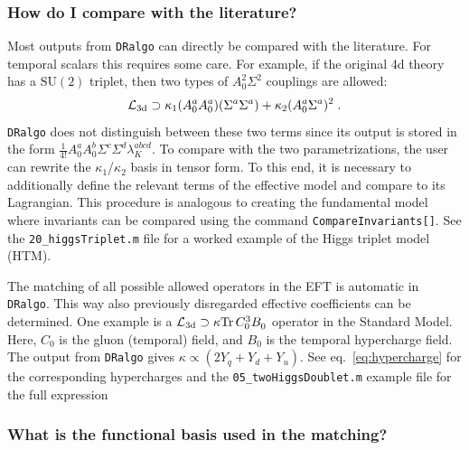 \documentclass[11pt]{article}
\def\dralgo{{\tt DRalgo}}
\renewcommand{\tr}{{\rm Tr\,}}
\newcommand{\Yq}{Y_{q}}
\newcommand{\Yu}{Y_{u}}
\newcommand{\Yd}{Y_{d}}
\renewcommand{\rmi}[1]{{\mbox{\scriptsize #1}}}
\begin{document}
%
\subsubsection{How do I compare with the literature?}
Most outputs from \dralgo{} can directly be compared with the literature.
For temporal scalars this requires some care. 
For example,
if the original 4d theory has a $\mathrm{SU}(2)$ triplet,
then two types of $A_0^2 \Sigma^2$ couplings are allowed:
\begin{align}
  \mathcal{L}_{\rmi{3d}} \supset
  \kappa_1 (A_0^a A_0^a)(\Sigma^a\Sigma^a) +
  \kappa_2 (A_0^a \Sigma^a)^2
  \;.
\end{align}
\dralgo{} does not distinguish between these two terms
since its output is stored in the form
$\frac{1}{4!}A_0^a A_0^b \Sigma^c \Sigma^d \lambda_K^{abcd}$.
To compare with the two parametrizations,
the user can rewrite the
$\kappa_1$/$\kappa_2$ basis in tensor form.
To this end,
it is necessary to additionally define the relevant terms of
the effective model and compare to its Lagrangian.
This procedure is analogous to creating the fundamental model where
invariants can be compared using the command
{\tt CompareInvariants[]}.
See the {\tt 20\_higgsTriplet.m} file for a worked example of
the Higgs triplet model (HTM).

The matching of all possible allowed operators in the EFT is automatic
in \dralgo{}.
This way also previously disregarded effective coefficients can be determined.
One example is a
$\mathcal{L}_{\rmi{3d}} \supset \kappa \tr C_{0}^3B_{0}^{ }$
operator in the Standard Model.
Here,
$C_0$ is the gluon (temporal) field, and
$B_0$ is the temporal hypercharge field.
The output from \dralgo{} gives
$\kappa \propto (2\Yq + \Yd + \Yu)$.
See
eq.~\eqref{eq:hypercharge} for the corresponding hypercharges and
the {\tt 05\_twoHiggsDoublet.m} example file for the full expression

%
\subsubsection{What is the functional basis used in the matching?}
\label{sec:basis}
\end{document}
